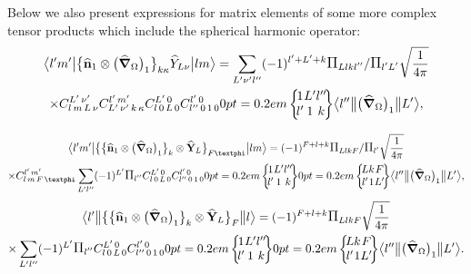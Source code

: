 Below we also present expressions for matrix elements of some more complex tensor products which include the spherical harmonic operator:
\begin{multline}
\braOket{ l^{\prime} m^{\prime}}{\bigl\{\widehat{\vect{n}}_{1} \otimes\bigl(\delop_{\Omega}\bigr)_{1}\bigr\}_{k \kappa} \widehat{Y}_{L \nu}}{l m}=\sum_{L^{\prime} \nu^{\prime} l^{\prime \prime}}(-1)^{l^{\prime}+L^{\prime}+k} \Fact{L l k l^{\prime \prime}}/\Fact{l^\prime L^\prime}\sqrt{\frac{1}{4 \pi}} \\
\times 
\clebsch{l}{m}{L}{\nu}{L^{\prime}}{\nu^{\prime}} 
\clebsch{L^{\prime}}{\nu^{\prime}}{k}{\kappa}{l^{\prime}}{m^{\prime}} 
\clebsch{l}{0}{L}{0}{L^{\prime}}{0} 
\clebsch{l^{\prime\prime}}{0}{1}{0}{l^{\prime}}{0} 
\sixj{1}{L^{\prime}}{l^{\prime \prime}}{l^{\prime}}{1}{k}
\braOketred{l^{\prime \prime}}{\bigl(\delop_{\Omega}\bigr)_{1}}{ L^{\prime}},  \label{eq:13:2:128}
\end{multline}

\begin{multline}
\braOket{ l^{\prime} m^{\prime}}{\bigl\{\bigl\{\widehat{\vect{n}}_{1} \otimes\bigl(\delop_{\Omega}\bigr)_{1}\bigr\}_{k} \otimes \widehat{\vect{Y}}_{L}\bigr\}_{F \varphi}}{l m}=(-1)^{F+l+k} \Fact{L l k F}/\Fact{l^\prime}\sqrt{\frac{1}{4 \pi}} \\
 \times 
\clebsch{l}{m}{F}{\varphi}{l^{\prime}}{m^{\prime}} \sum_{L^{\prime} l^{\prime \prime}}(-1)^{L^{\prime}} \Fact{l^{\prime \prime}} 
\clebsch{l}{0}{L}{0}{L^{\prime}}{0} 
\clebsch{l^{\prime\prime}}{0}{1}{0}{l^{\prime}}{0} 
\sixj{1}{L^{\prime}}{l^{\prime \prime}}{l^{\prime}}{1}{k}
\sixj{L}{k}{F}{l^{\prime}}{1}{L^{\prime}}
\braOketred{l^{\prime \prime}}{\bigl(\delop_{\Omega}\bigr)_{1}}{ L^{\prime}}, \label{eq:13:2:129}
\end{multline}
\begin{multline*}
\braOketred{ l^{\prime}}{\bigl\{\bigl\{\widehat{\vect{n}}_{1} \otimes\bigl(\delop_{\Omega}\bigr)_{1}\bigr\}_{k} \otimes \widehat{\vect{Y}}_{L}\bigr\}_{F}}{ l}=(-1)^{F+l+k} \Fact{L l k F}\sqrt{\frac{1}{4 \pi}} \\
\times \sum_{L^{\prime} l^{\prime \prime}}(-1)^{L^{\prime}} \Fact{l^{\prime \prime}}
\clebsch{l}{0}{L}{0}{L^{\prime}}{0}
\clebsch{l^{\prime\prime}}{0}{1}{0}{l^{\prime}}{0}
\sixj{1}{L^{\prime}}{l^{\prime \prime}}{l^{\prime}}{1}{k}
\sixj{L}{k}{F}{l^{\prime}}{1}{L^{\prime}}
\braOketred{l^{\prime \prime}}{\bigl(\delop_{\Omega}\bigr)_{1}}{ L^{\prime}}.
\end{multline*}

